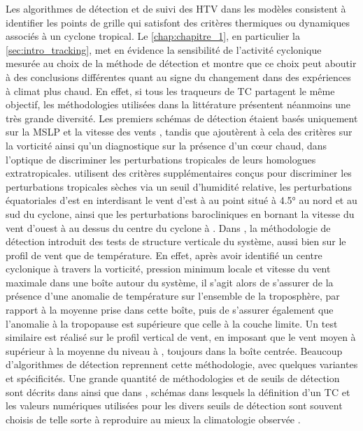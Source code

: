\documentclass[../main.tex]{subfiles}
\begin{document}
Les algorithmes de détection et de suivi des HTV dans les modèles consistent à identifier les points de grille qui satisfont des critères thermiques ou
dynamiques associés à un cyclone tropical. Le \cref{chap:chapitre_1}, en particulier la \cref{sec:intro_tracking}, met en évidence la sensibilité de l'activité
cyclonique mesurée au choix de la méthode de détection et montre que ce choix peut aboutir à des conclusions différentes quant au signe du changement dans des
expériences à climat plus chaud. En effet, si tous les traqueurs de TC partagent le même objectif, les méthodologies utilisées dans la littérature présentent
néanmoins une très grande diversité. Les premiers schémas de détection étaient basés uniquement sur la MSLP et la vitesse des vents
\parencite{bengtsson_simulation_1982,broccoli_can_1990}, tandis que \cite{haarsma_tropical_1993,bengtsson_hurricanetype_1995} ajoutèrent à cela des critères sur
la vorticité ainsi qu'un diagnostique sur la présence d'un cœur chaud, dans l'optique de discriminer les perturbations tropicales de leurs homologues
extratropicales. \cite{wu_gcm_1992} utilisent des critères supplémentaires conçus pour discriminer les perturbations tropicales sèches via un seuil d'humidité
relative, les perturbations équatoriales d'est en interdisant le vent d'est à  au point situé à \ang{4.5} au nord et au sud du cyclone, ainsi que les
perturbations barocliniques en bornant la vitesse du vent d'ouest à  au dessus du centre du cyclone à . Dans \cite{bengtsson_hurricanetype_1995},
la méthodologie de détection introduit des tests de structure verticale du système, aussi bien sur le profil de vent que de température. En effet, après avoir
identifié un centre cyclonique à travers la vorticité, pression minimum locale et vitesse du vent maximale dans une boîte autour du système, il s'agit alors de
s'assurer de la présence d'une anomalie de température sur l'ensemble de la troposphère, par rapport à la moyenne prise dans cette boîte, puis de s'assurer
également que l'anomalie à la tropopause est supérieure que celle à la couche limite. Un test similaire est réalisé sur le profil vertical de vent, en imposant
que le vent moyen à  supérieur à la moyenne du niveau à , toujours dans la boîte centrée. Beaucoup d'algorithmes de détection reprennent cette
méthodologie, avec quelques variantes et spécificités. Une grande quantité de méthodologies et de seuils de détection sont décrits dans
\cite{walsh_objectively_2007} ainsi que dans \cite[][Annexe B]{ullrich_tempestextremes_2017}, schémas dans lesquels la définition d'un TC et les valeurs
numériques utilisées pour les divers seuils de détection sont souvent choisis de telle sorte à reproduire au mieux la climatologie observée
\parencite{walsh_objectively_2007,tory_development_2013}.
\end{document}
